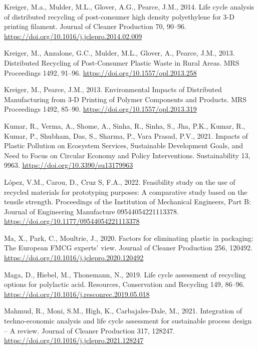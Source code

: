 \documentclass[12pt]{elsarticle} %
\newlength{\cslhangindent}
\newlength{\cslentryspacingunit} %
\newenvironment{CSLReferences}[2] %
 {%
  \setlength{\parindent}{0pt}
  \ifodd #1
  \let\oldpar\par
  \def\par{\hangindent=\cslhangindent\oldpar}
  \fi
  \setlength{\parskip}{#2\cslentryspacingunit}
 }%
 {}
\begin{document}
\begin{CSLReferences}{1}{0}
\leavevmode{}%
Kreiger, M.a., Mulder, M.L., Glover, A.G., Pearce, J.M., 2014. Life cycle analysis of distributed recycling of post-consumer high density polyethylene for 3-{D} printing filament. Journal of Cleaner Production 70, 90--96. \url{https://doi.org/10.1016/j.jclepro.2014.02.009}

\leavevmode{}%
Kreiger, M., Anzalone, G.C., Mulder, M.L., Glover, A., Pearce, J.M., 2013. Distributed {Recycling} of {Post-Consumer Plastic Waste} in {Rural Areas}. MRS Proceedings 1492, 91--96. \url{https://doi.org/10.1557/opl.2013.258}

\leavevmode{}%
Kreiger, M., Pearce, J.M., 2013. Environmental {Impacts} of {Distributed Manufacturing} from 3-{D Printing} of {Polymer Components} and {Products}. MRS Proceedings 1492, 85--90. \url{https://doi.org/10.1557/opl.2013.319}

\leavevmode{}%
Kumar, R., Verma, A., Shome, A., Sinha, R., Sinha, S., Jha, P.K., Kumar, R., Kumar, P., Shubham, Das, S., Sharma, P., Vara Prasad, P.V., 2021. Impacts of {Plastic Pollution} on {Ecosystem Services}, {Sustainable Development Goals}, and {Need} to {Focus} on {Circular Economy} and {Policy Interventions}. Sustainability 13, 9963. \url{https://doi.org/10.3390/su13179963}

\leavevmode{}%
López, V.M., Carou, D., Cruz S, F.A., 2022. Feasibility study on the use of recycled materials for prototyping purposes: {A} comparative study based on the tensile strength. Proceedings of the Institution of Mechanical Engineers, Part B: Journal of Engineering Manufacture 09544054221113378. \url{https://doi.org/10.1177/09544054221113378}

\leavevmode{}%
Ma, X., Park, C., Moultrie, J., 2020. Factors for eliminating plastic in packaging: {The European FMCG} experts' view. Journal of Cleaner Production 256, 120492. \url{https://doi.org/10.1016/j.jclepro.2020.120492}

\leavevmode{}%
Maga, D., Hiebel, M., Thonemann, N., 2019. Life cycle assessment of recycling options for polylactic acid. Resources, Conservation and Recycling 149, 86--96. \url{https://doi.org/10.1016/j.resconrec.2019.05.018}

\leavevmode{}%
Mahmud, R., Moni, S.M., High, K., Carbajales-Dale, M., 2021. Integration of techno-economic analysis and life cycle assessment for sustainable process design -- {A} review. Journal of Cleaner Production 317, 128247. \url{https://doi.org/10.1016/j.jclepro.2021.128247}


\end{CSLReferences}
\end{document}
